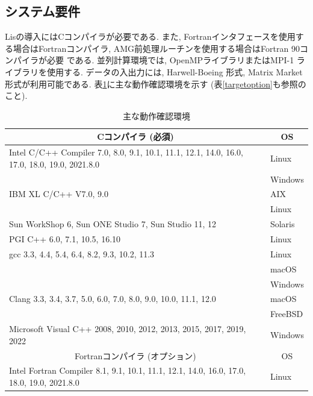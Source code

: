 \documentclass[a4paper]{jarticle}
\begin{document}
\subsection{システム要件}
Lisの導入にはCコンパイラが必要である. 
また, Fortranインタフェースを使用する場合はFortranコンパイラ, 
AMG前処理ルーチンを使用する場合はFortran 90コンパイラが必要
である. 並列計算環境では, OpenMPライブラリ\cite{OpenMP}またはMPI-1
ライブラリ\cite{MPI}を使用する\cite{kota1,kota2}. 
データの入出力には, Harwell-Boeing 
形式\cite{duff92}, Matrix Market形式\cite{matrixmarket}が利用可能である. 
表\ref{platforms}に主な動作確認環境を示す
 (表\ref{targetoption}も参照のこと). 

\begin{table}[htbp]
\caption{主な動作確認環境}
\label{platforms}
\begin{center}
{\small
 \begin{tabular}{l|l}
\hline
\multicolumn{1}{c|}{Cコンパイラ (必須) } & \multicolumn{1}{c}{OS} \\
\hline
Intel C/C++ Compiler 7.0, 8.0, 9.1, 10.1, 11.1, 12.1, 14.0, 16.0, 17.0, 18.0, 19.0, 2021.8.0 & Linux \\
                                                     & Windows  \\
\hline
IBM XL C/C++ V7.0, 9.0                     & AIX   \\
                                           & Linux \\
\hline
Sun WorkShop 6, Sun ONE Studio 7, Sun Studio 11, 12  & Solaris \\
\hline
PGI C++ 6.0, 7.1, 10.5, 16.10              & Linux \\
\hline
gcc 3.3, 4.4, 5.4, 6.4, 8.2, 9.3, 10.2, 11.3     & Linux \\
                                           & macOS \\
                                           & Windows \\
\hline
Clang 3.3, 3.4, 3.7, 5.0, 6.0, 7.0, 8.0, 9.0, 10.0, 11.1, 12.0 & macOS \\
                                           & FreeBSD \\
\hline
Microsoft Visual C++ 2008, 2010, 2012, 2013, 2015, 2017, 2019, 2022 & Windows \\
\hline
\hline
\multicolumn{1}{c|}{Fortranコンパイラ (オプション) } & \multicolumn{1}{c}{OS} \\
\hline
Intel Fortran Compiler 8.1, 9.1, 10.1, 11.1, 12.1, 14.0, 16.0, 17.0, 18.0, 19.0, 2021.8.0 & Linux \\

\end{tabular}}
\end{center}
\end{table}
\end{document}
